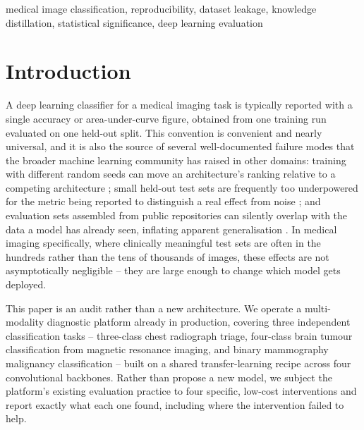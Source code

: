 \documentclass[conference]{IEEEtran}
\begin{document}
\begin{IEEEkeywords}
medical image classification, reproducibility, dataset leakage, knowledge distillation, statistical significance, deep learning evaluation
\end{IEEEkeywords}

\section{Introduction}

A deep learning classifier for a medical imaging task is typically reported with a single accuracy or area-under-curve figure, obtained from one training run evaluated on one held-out split. This convention is convenient and nearly universal, and it is also the source of several well-documented failure modes that the broader machine learning community has raised in other domains: training with different random seeds can move an architecture's ranking relative to a competing architecture \cite{picard2021}; small held-out test sets are frequently too underpowered for the metric being reported to distinguish a real effect from noise \cite{henderson2018}; and evaluation sets assembled from public repositories can silently overlap with the data a model has already seen, inflating apparent generalisation \cite{kapoor2023leakage}. In medical imaging specifically, where clinically meaningful test sets are often in the hundreds rather than the tens of thousands of images, these effects are not asymptotically negligible -- they are large enough to change which model gets deployed.

This paper is an audit rather than a new architecture. We operate a multi-modality diagnostic platform already in production, covering three independent classification tasks -- three-class chest radiograph triage, four-class brain tumour classification from magnetic resonance imaging, and binary mammography malignancy classification -- built on a shared transfer-learning recipe across four convolutional backbones. Rather than propose a new model, we subject the platform's existing evaluation practice to four specific, low-cost interventions and report exactly what each one found, including where the intervention failed to help.
\end{document}

